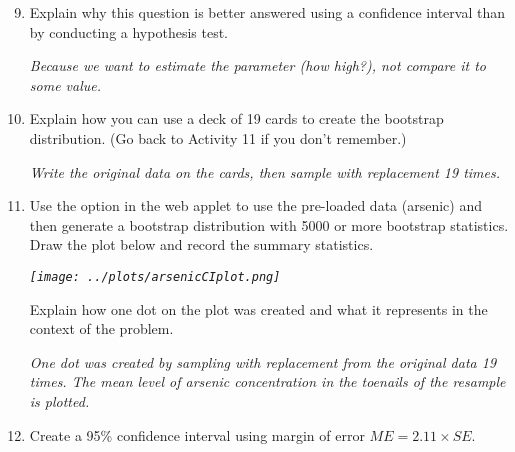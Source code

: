 \begin{enumerate}
 \setcounter{enumi}{8}
\item  Explain why this question is better answered using a confidence
  interval than by conducting a hypothesis test. 
\begin{students}
  \vspace{1cm}
\end{students}
\begin{key}
  {\it  Because we want to estimate the parameter (how high?), not
    compare it to some value.}
\end{key}

\item  Explain how you can use a deck of 19 cards to create the
  bootstrap distribution. (Go back to Activity 11 if you don't remember.)
\begin{students}
  \vspace{1cm}
\end{students}
\begin{key}
  {\it Write the original data on the cards, then sample with replacement 19
    times.}
\end{key}

\item Use the  option in the web applet
  \webAppURLFrst to use the pre-loaded
  data (arsenic) and then generate a bootstrap distribution with 5000
  or more bootstrap statistics.  Draw the plot below and record the
  summary statistics.  %
\begin{students}
  \vspace{4cm}
\end{students}
\begin{key}
  {\it \texttt{[image: ../plots/arsenicCIplot.png]}}
\end{key}

Explain how one dot on the plot was created and what it represents in
the context of the problem.
\begin{students}
  \vspace{1cm}
\end{students}
\begin{key}
  {\it One dot was created by sampling with replacement from the
    original data 19 times.  The mean level of arsenic concentration
    in the toenails of the resample is plotted.}
\end{key}

\item \label{SE2ci} Create a 95\% confidence interval using margin of
  error $ME =  2.11  \times SE$.
\begin{students}
  \vspace{1cm}
\end{students}


\end{enumerate}
